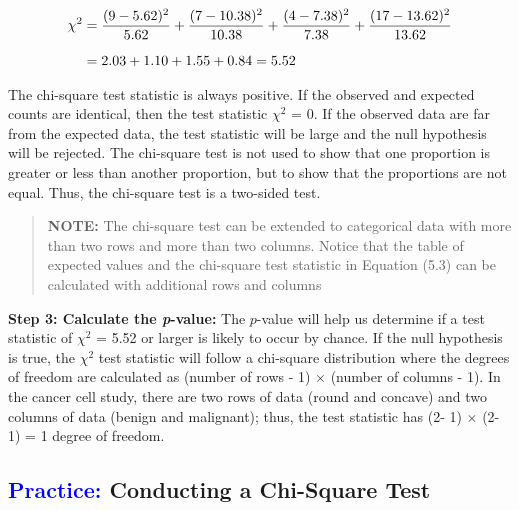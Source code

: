 \documentclass[
]{report}
\begin{document}
\begin{align}
\chi^2
&= \frac{(9 - 5.62)^2}{5.62} + \frac{(7 - 10.38)^2}{10.38} + \frac{(4 - 7.38)^2}{7.38} + \frac{(17 - 13.62)^2}{13.62} \\[6pt] \notag
&= 2.03 + 1.10 + 1.55 + 0.84 = 5.52 \notag
\end{align}

The chi-square test statistic is always positive. If the observed and expected counts are identical, then the test statistic \(\scriptstyle \chi^2\) = 0. If the observed data are far from the expected data, the test statistic will be large and the null hypothesis will be rejected. The chi-square test is not used to show that one proportion is greater or less than another proportion, but to show that the proportions are not equal. Thus, the chi-square test is a two-sided test.

\begin{quote}
\textbf{NOTE:} The chi-square test can be extended to categorical data with more than two rows and more than two columns. Notice that the table of expected values and the chi-square test statistic in Equation (5.3) can be calculated with additional rows and columns
\end{quote}

\textbf{Step 3: Calculate the \emph{p}-value:}
The \(\scriptstyle p\)-value will help us determine if a test statistic of \(\scriptstyle \chi^2\) = 5.52 or larger is likely to occur by chance. If the null hypothesis is true, the \(\scriptstyle \chi^2\) test statistic will follow a chi-square distribution where the degrees of freedom are calculated as (number of rows - 1) \(\times\) (number of columns - 1). In the cancer cell study, there are two rows of data (round and concave) and two columns of data (benign and malignant); thus, the test statistic has (2- 1) \(\times\) (2- 1) = 1 degree of freedom.

\hypertarget{conducting-a-chi-square-test}{%
\subsection*{\texorpdfstring{\textcolor{blue}{Practice:} Conducting a Chi-Square Test}{ Conducting a Chi-Square Test}}\label{conducting-a-chi-square-test}}
\end{document}
